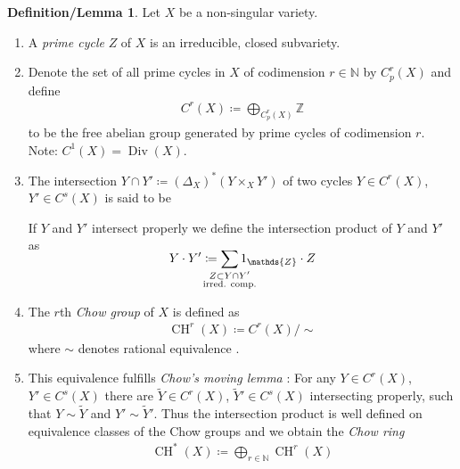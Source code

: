 \documentclass[english,headsepline=0.25pt]{scrartcl}
\theoremstyle{definition}
\newtheorem{DefLem}[Def]{Definition/Lemma}
\theoremstyle{remark}
\newcommand*{\N}{\mathds{N}}
\newcommand*{\Z}{\mathds{Z}}
\DeclareMathOperator{\codim}{codim} %
\newcommand*{\intProd}[2]{{#1\cdot#2}} %
\newcommand*{\Diag}[1]{{\Delta_{#1}}} %
\DeclareMathOperator{\CH}{CH} %
\DeclareMathOperator{\Div}{Div} %
\begin{document}
\begin{DefLem}
  Let $X$ be a non-singular variety.
  \begin{enumerate}
  \item A \emph{prime cycle} $Z$ of $X$ is an irreducible, closed
    subvariety.
  \item Denote the set of all prime cycles in $X$ of codimension
    $r\in\N$ by $C_p^r(X)$ and define
    \begin{gather*}
      C^r(X) \coloneqq \bigoplus_{C_p^r(X)}\Z
    \end{gather*}
    to be the free abelian group generated by prime cycles of
    codimension $r$.
    Note: $C^1(X)=\Div(X)$.
  \item The intersection
    $Y\cap Y'\coloneqq (\Diag{X})^*(Y\times_X Y')$ of two cycles 
    $Y\in C^r(X)$, $Y'\in C^s(X)$ is said to be
    If $Y$ and $Y'$ intersect properly we define
    the intersection product of $Y$ and $Y'$ as
    \begin{gather*}
      \SwapAboveDisplaySkip
      \intProd{Y}{Y'} \coloneqq
      \sum_{\mathclap{
          \substack{Z\subset Y\cap Y'\\
            \text{irred. comp.}
          }}} 1_\Z\cdot Z
    \end{gather*}
  \item The $r$th \emph{Chow group} of $X$ is defined as
    \begin{gather*}
      \CH^r(X) \coloneqq C^r(X)/\sim
    \end{gather*}
    where $\sim$ denotes rational equivalence
    \cite[see][p.\,426]{hartshorne}.
  \item This equivalence fulfills \emph{Chow's moving lemma}
    \cite[][p.\,427]{hartshorne}:
    For any $Y\in C^r(X)$, $Y'\in C^s(X)$ there are
    $\widetilde Y\in C^r(X)$, $\widetilde Y'\in C^s(X)$ intersecting
    properly, such that $Y\sim\widetilde Y$ and $Y'\sim\widetilde Y'$.
    Thus the intersection product is well defined on equivalence
    classes of the Chow groups and we obtain the \emph{Chow ring}
    \begin{gather*}
      \CH^*(X) \coloneqq \bigoplus_{r\in\N} \CH^r(X)
    \end{gather*}
  \end{enumerate}
\end{DefLem}
\end{document}
